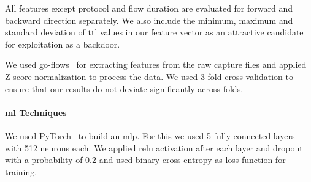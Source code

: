 \documentclass[10pt,sigconf,letterpaper,dvipsnames]{acmart}
\begin{document}
All features except protocol and flow duration are evaluated for forward and backward direction separately.
We also include the minimum, maximum and standard deviation of \gls{ttl} values in our feature vector as an attractive candidate for exploitation as a backdoor. %

We used go-flows~\cite{vormayr_go-flows_2019}
for extracting features from the raw capture files and applied Z-score normalization to process the data. We used 3-fold cross validation to ensure that our results do not deviate significantly across folds.


\paragraph{\gls{ml} Techniques}
We used PyTorch~\cite{paszke_automatic_nodate} to build an \gls{mlp}. 
For this we used 5 fully connected layers with 512 neurons each. We applied \gls{relu} activation after each layer and dropout with a probability of 0.2 and used binary cross entropy  as loss function for training. %
\end{document}
